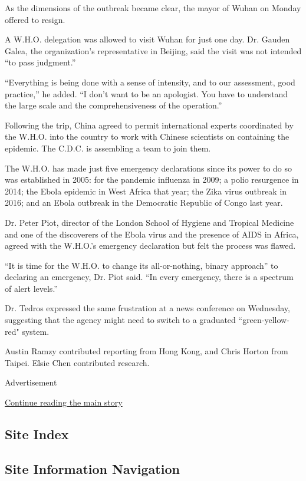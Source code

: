 As the dimensions of the outbreak became clear, the mayor of Wuhan on
Monday offered to resign.

A W.H.O. delegation was allowed to visit Wuhan for just one day. Dr.
Gauden Galea, the organization's representative in Beijing, said the
visit was not intended ``to pass judgment.''

``Everything is being done with a sense of intensity, and to our
assessment, good practice,'' he added. ``I don't want to be an
apologist. You have to understand the large scale and the
comprehensiveness of the operation.''

Following the trip, China agreed to permit international experts
coordinated by the W.H.O. into the country to work with Chinese
scientists on containing the epidemic. The C.D.C. is assembling a team
to join them.

The W.H.O. has made just five emergency declarations since its power to
do so was established in 2005: for the pandemic influenza in 2009; a
polio resurgence in 2014; the Ebola epidemic in West Africa that year;
the Zika virus outbreak in 2016; and an Ebola outbreak in the Democratic
Republic of Congo last year.

Dr. Peter Piot, director of the London School of Hygiene and Tropical
Medicine and one of the discoverers of the Ebola virus and the presence
of AIDS in Africa, agreed with the W.H.O.'s emergency declaration but
felt the process was flawed.

``It is time for the W.H.O. to change its all-or-nothing, binary
approach'' to declaring an emergency, Dr. Piot said. ``In every
emergency, there is a spectrum of alert levels.''

Dr. Tedros expressed the same frustration at a news conference on
Wednesday, suggesting that the agency might need to switch to a
graduated ``green-yellow-red" system.

Austin Ramzy contributed reporting from Hong Kong, and Chris Horton from
Taipei. Elsie Chen contributed research.

Advertisement

\protect\hyperlink{after-bottom}{Continue reading the main story}

\hypertarget{site-index}{%
\subsection{Site Index}\label{site-index}}

\hypertarget{site-information-navigation}{%
\subsection{Site Information
Navigation}\label{site-information-navigation}}


